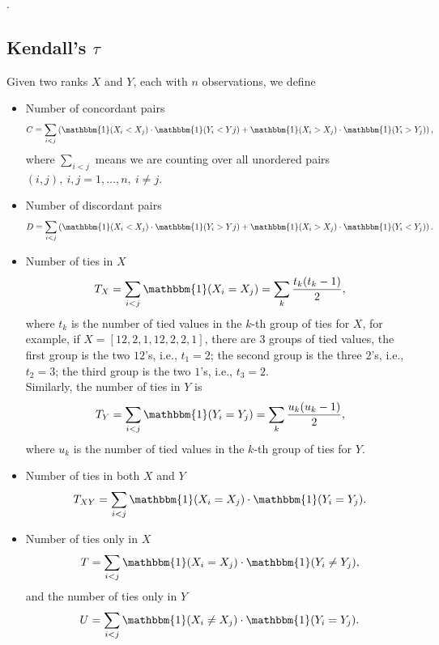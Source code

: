.



\subsection{Kendall's $\tau$}
\label{sec:kendalltau}

Given two ranks $X$ and $Y$, each with $n$ observations, we define
\begin{itemize}
\item Number of concordant pairs 
      \begin{equation*}
      C = \sum_{i < j} \left( \mathbbm{1}(X_i < X_j) \cdot \mathbbm{1}(Y_i < Yj) + \mathbbm{1}(X_i > X_j) \cdot \mathbbm{1}(Y_i > Y_j) \right),
      \end{equation*}
      where $\sum_{i < j}$ means we are counting over all unordered pairs $(i, j),~ i,j=1,\dots,n,~ i \ne j$.

\item Number of discordant pairs 
      \begin{equation*}
      D = \sum_{i < j} \left( \mathbbm{1}(X_i < X_j) \cdot \mathbbm{1}(Y_i > Yj) + \mathbbm{1}(X_i > X_j) \cdot \mathbbm{1}(Y_i < Y_j) \right).
      \end{equation*}

\item Number of ties in $X$
      \begin{equation*}
      T_X = \sum_{i < j} \mathbbm{1}(X_i = X_j) = \sum_k \frac{t_k (t_k - 1)}{2},
      \end{equation*}
      where $t_k$ is the number of tied values in the $k$-th group of ties for $X$, for example, if
      $X = [12, 2, 1, 12, 2, 2, 1]$, there are $3$ groups of tied values, the first group is the two $12$'s, i.e., $t_1 = 2$;
      the second group is the three $2$'s, i.e., $t_2 = 3$; the third group is the two $1$'s, i.e., $t_3 = 2$. \\
      Similarly, the number of ties in $Y$ is 
      \begin{equation*}
      T_Y = \sum_{i < j} \mathbbm{1}(Y_i = Y_j) = \sum_k \frac{u_k (u_k - 1)}{2},
      \end{equation*}
      where $u_k$ is the number of tied values in the $k$-th group of ties for $Y$.

\item Number of ties in both $X$ and $Y$
      \begin{equation*}
      T_{XY} = \sum_{i < j} \mathbbm{1}(X_i = X_j) \cdot \mathbbm{1}(Y_i = Y_j).
      \end{equation*}

\item Number of ties only in $X$
      \begin{equation*}
      T = \sum_{i < j} \mathbbm{1}(X_i = X_j) \cdot \mathbbm{1}(Y_i \ne Y_j),
      \end{equation*}
      and the number of ties only in $Y$
      \begin{equation*}
      U = \sum_{i < j} \mathbbm{1}(X_i \ne X_j) \cdot \mathbbm{1}(Y_i = Y_j).
      \end{equation*}
\end{itemize}

